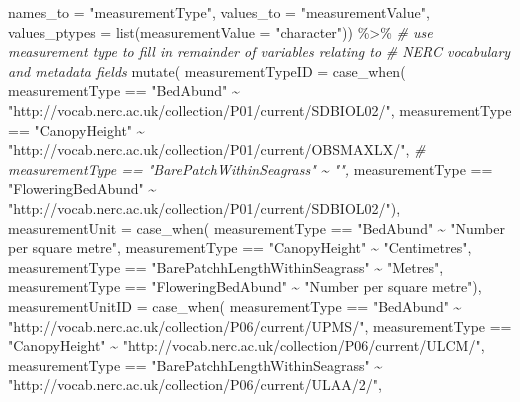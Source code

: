 \documentclass[
]{book}
\newenvironment{Shaded}{\begin{snugshade}}{\end{snugshade}}
\newcommand{\AttributeTok}[1]{\textcolor[rgb]{0.77,0.63,0.00}{#1}}
\newcommand{\CommentTok}[1]{\textcolor[rgb]{0.56,0.35,0.01}{\textit{#1}}}
\newcommand{\FunctionTok}[1]{\textcolor[rgb]{0.00,0.00,0.00}{#1}}
\newcommand{\NormalTok}[1]{#1}
\newcommand{\SpecialCharTok}[1]{\textcolor[rgb]{0.00,0.00,0.00}{#1}}
\newcommand{\StringTok}[1]{\textcolor[rgb]{0.31,0.60,0.02}{#1}}
\begin{document}
\begin{Shaded}
\begin{Highlighting}[]
                \AttributeTok{names\_to =} \StringTok{"measurementType"}\NormalTok{,}
                \AttributeTok{values\_to =} \StringTok{"measurementValue"}\NormalTok{,}
                \AttributeTok{values\_ptypes =} \FunctionTok{list}\NormalTok{(}\AttributeTok{measurementValue =} \StringTok{"character"}\NormalTok{)) }\SpecialCharTok{\%\textgreater{}\%} 
  \CommentTok{\# use measurement type to fill in remainder of variables relating to }
  \CommentTok{\# NERC vocabulary and metadata fields}
  \FunctionTok{mutate}\NormalTok{(}
    \AttributeTok{measurementTypeID =} \FunctionTok{case\_when}\NormalTok{(}
\NormalTok{      measurementType }\SpecialCharTok{==} \StringTok{"BedAbund"} \SpecialCharTok{\textasciitilde{}} \StringTok{"http://vocab.nerc.ac.uk/collection/P01/current/SDBIOL02/"}\NormalTok{,}
\NormalTok{      measurementType }\SpecialCharTok{==} \StringTok{"CanopyHeight"} \SpecialCharTok{\textasciitilde{}} \StringTok{"http://vocab.nerc.ac.uk/collection/P01/current/OBSMAXLX/"}\NormalTok{,}
      \CommentTok{\# measurementType == "BarePatchWithinSeagrass" \textasciitilde{} "",}
\NormalTok{      measurementType }\SpecialCharTok{==} \StringTok{"FloweringBedAbund"} \SpecialCharTok{\textasciitilde{}} \StringTok{"http://vocab.nerc.ac.uk/collection/P01/current/SDBIOL02/"}\NormalTok{),}
    \AttributeTok{measurementUnit =} \FunctionTok{case\_when}\NormalTok{(}
\NormalTok{      measurementType }\SpecialCharTok{==} \StringTok{"BedAbund"} \SpecialCharTok{\textasciitilde{}} \StringTok{"Number per square metre"}\NormalTok{,}
\NormalTok{      measurementType }\SpecialCharTok{==} \StringTok{"CanopyHeight"} \SpecialCharTok{\textasciitilde{}} \StringTok{"Centimetres"}\NormalTok{,}
\NormalTok{      measurementType }\SpecialCharTok{==} \StringTok{"BarePatchhLengthWithinSeagrass"} \SpecialCharTok{\textasciitilde{}} \StringTok{"Metres"}\NormalTok{,}
\NormalTok{      measurementType }\SpecialCharTok{==} \StringTok{"FloweringBedAbund"} \SpecialCharTok{\textasciitilde{}} \StringTok{"Number per square metre"}\NormalTok{),}
    \AttributeTok{measurementUnitID =} \FunctionTok{case\_when}\NormalTok{(}
\NormalTok{      measurementType }\SpecialCharTok{==} \StringTok{"BedAbund"} \SpecialCharTok{\textasciitilde{}} \StringTok{"http://vocab.nerc.ac.uk/collection/P06/current/UPMS/"}\NormalTok{,}
\NormalTok{      measurementType }\SpecialCharTok{==} \StringTok{"CanopyHeight"} \SpecialCharTok{\textasciitilde{}} \StringTok{"http://vocab.nerc.ac.uk/collection/P06/current/ULCM/"}\NormalTok{,}
\NormalTok{      measurementType }\SpecialCharTok{==} \StringTok{"BarePatchhLengthWithinSeagrass"} \SpecialCharTok{\textasciitilde{}} \StringTok{"http://vocab.nerc.ac.uk/collection/P06/current/ULAA/2/"}\NormalTok{,}

\end{Highlighting}
\end{Shaded}
\end{document}
